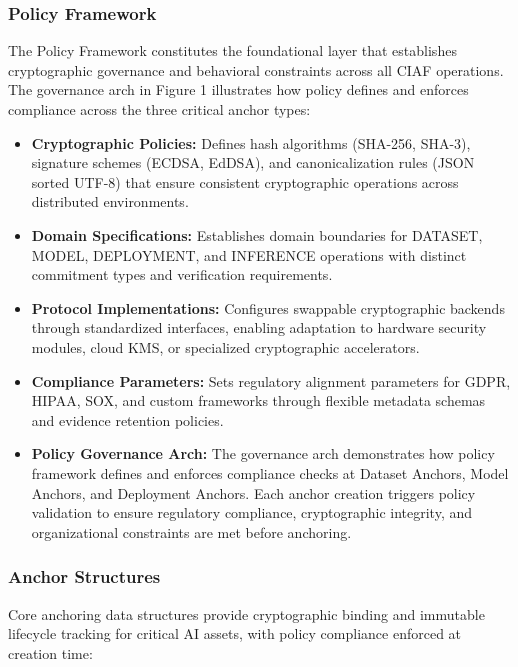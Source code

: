 \documentclass[12pt,a4paper]{article}
\begin{document}
\subsubsection{Policy Framework}

The Policy Framework constitutes the foundational layer that establishes cryptographic governance and behavioral constraints across all CIAF operations. The governance arch in Figure 1 illustrates how policy defines and enforces compliance across the three critical anchor types:

\begin{itemize}
    \item \textbf{Cryptographic Policies:} Defines hash algorithms (SHA-256, SHA-3), signature schemes (ECDSA, EdDSA), and canonicalization rules (JSON sorted UTF-8) that ensure consistent cryptographic operations across distributed environments.
    
    \item \textbf{Domain Specifications:} Establishes domain boundaries for DATASET, MODEL, DEPLOYMENT, and INFERENCE operations with distinct commitment types and verification requirements.
    
    \item \textbf{Protocol Implementations:} Configures swappable cryptographic backends through standardized interfaces, enabling adaptation to hardware security modules, cloud KMS, or specialized cryptographic accelerators.
    
    \item \textbf{Compliance Parameters:} Sets regulatory alignment parameters for GDPR, HIPAA, SOX, and custom frameworks through flexible metadata schemas and evidence retention policies.
    
    \item \textbf{Policy Governance Arch:} The governance arch demonstrates how policy framework defines and enforces compliance checks at Dataset Anchors, Model Anchors, and Deployment Anchors. Each anchor creation triggers policy validation to ensure regulatory compliance, cryptographic integrity, and organizational constraints are met before anchoring.
\end{itemize}

\subsubsection{Anchor Structures}

Core anchoring data structures provide cryptographic binding and immutable lifecycle tracking for critical AI assets, with policy compliance enforced at creation time:
\end{document}
